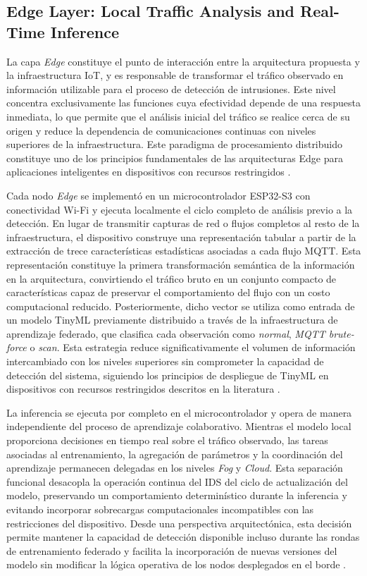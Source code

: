 \documentclass[journal,article,submit,moreauthors]{Definitions/mdpi}
\begin{document}
\subsection{Edge Layer: Local Traffic Analysis and Real-Time Inference}
La capa \textit{Edge} constituye el punto de interacción entre la arquitectura propuesta y la infraestructura IoT, y es responsable de transformar el tráfico observado en información utilizable para el proceso de detección de intrusiones. Este nivel concentra exclusivamente las funciones cuya efectividad depende de una respuesta inmediata, lo que permite que el análisis inicial del tráfico se realice cerca de su origen y reduce la dependencia de comunicaciones continuas con niveles superiores de la infraestructura. Este paradigma de procesamiento distribuido constituye uno de los principios fundamentales de las arquitecturas Edge para aplicaciones inteligentes en dispositivos con recursos restringidos \cite{SaravanaBalaji2023,Ficco2024,HeydariSurvey2025,Tamuka2026}.

Cada nodo \textit{Edge} se implementó en un microcontrolador ESP32-S3 con conectividad Wi-Fi y ejecuta localmente el ciclo completo de análisis previo a la detección. En lugar de transmitir capturas de red o flujos completos al resto de la infraestructura, el dispositivo construye una representación tabular a partir de la extracción de trece características estadísticas asociadas a cada flujo MQTT. Esta representación constituye la primera transformación semántica de la información en la arquitectura, convirtiendo el tráfico bruto en un conjunto compacto de características capaz de preservar el comportamiento del flujo con un costo computacional reducido. Posteriormente, dicho vector se utiliza como entrada de un modelo TinyML previamente distribuido a través de la infraestructura de aprendizaje federado, que clasifica cada observación como \textit{normal}, \textit{MQTT brute-force} o \textit{scan}. Esta estrategia reduce significativamente el volumen de información intercambiado con los niveles superiores sin comprometer la capacidad de detección del sistema, siguiendo los principios de despliegue de TinyML en dispositivos con recursos restringidos descritos en la literatura \cite{Tekin2023,Amuthadevi2025,Dini2024,Fusco2025,Sun2026,Moustafa2019}.

La inferencia se ejecuta por completo en el microcontrolador y opera de manera independiente del proceso de aprendizaje colaborativo. Mientras el modelo local proporciona decisiones en tiempo real sobre el tráfico observado, las tareas asociadas al entrenamiento, la agregación de parámetros y la coordinación del aprendizaje permanecen delegadas en los niveles \textit{Fog} y \textit{Cloud}. Esta separación funcional desacopla la operación continua del IDS del ciclo de actualización del modelo, preservando un comportamiento determinístico durante la inferencia y evitando incorporar sobrecargas computacionales incompatibles con las restricciones del dispositivo. Desde una perspectiva arquitectónica, esta decisión permite mantener la capacidad de detección disponible incluso durante las rondas de entrenamiento federado y facilita la incorporación de nuevas versiones del modelo sin modificar la lógica operativa de los nodos desplegados en el borde \cite{Ma2024,Dritsas2025}.
\end{document}
